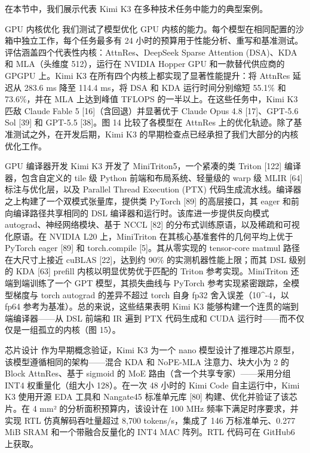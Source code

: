 \documentclass[
  10
]{article}
\begin{document}
在本节中，我们展示代表 Kimi K3 在多种技术任务中能力的典型案例。

GPU 内核优化 我们测试了模型优化 GPU 内核的能力。每个模型在相同配置的沙箱中独立工作，每个任务最多有 24 小时的预算用于性能分析、重写和基准测试。评估涵盖四个代表性内核：AttnRes、DeepSeek Sparse Attention (DSA)、KDA 和 MLA（头维度 512），运行在 NVIDIA Hopper GPU 和一款替代供应商的 GPGPU 上。Kimi K3 在所有四个内核上都实现了显著性能提升：将 AttnRes 延迟从 283.6 ms 降至 114.4 ms，将 DSA 和 KDA 运行时间分别缩短 55.1\% 和 73.6\%，并在 MLA 上达到峰值 TFLOPS 的一半以上。在这些任务中，Kimi K3 匹敌 Claude Fable 5 {[}16{]}（含回退）并显著优于 Claude Opus 4.8 {[}17{]}、GPT-5.6 Sol {[}39{]} 和 GPT-5.5 {[}38{]}。图 14 比较了各模型在 AttnRes 上的优化轨迹。除了基准测试之外，在开发后期，Kimi K3 的早期检查点已经承担了我们大部分的内核优化工作。

GPU 编译器开发 Kimi K3 开发了 MiniTriton5，一个紧凑的类 Triton {[}122{]} 编译器，包含自定义的 tile 级 Python 前端和布局系统、轻量级的 warp 级 MLIR {[}64{]} 标注与优化层，以及 Parallel Thread Execution (PTX) 代码生成流水线。编译器之上构建了一个双模式张量库，提供类 PyTorch {[}89{]} 的高层接口，其 eager 和前向编译路径共享相同的 DSL 编译器和运行时。该库进一步提供反向模式 autograd、神经网络模块、基于 NCCL {[}82{]} 的分布式训练原语，以及稀疏和可视化原语。在 NVIDIA L20 上，MiniTriton 在其核心基准套件的几何平均上优于 PyTorch eager {[}89{]} 和 torch.compile {[}5{]}。其从零实现的 tensor-core matmul 路径在大尺寸上接近 cuBLAS {[}22{]}，达到约 90\% 的实测机器性能上限；而其 DSL 级别的 KDA {[}63{]} prefill 内核以明显优势优于匹配的 Triton 参考实现。MiniTriton 还端到端训练了一个 GPT 模型，其损失曲线与 PyTorch 参考实现紧密跟踪，全模型梯度与 torch autograd 的差异不超过 torch 自身 fp32 舍入误差（10^{-4}，以 fp64 参考为基准）。总的来说，这些结果表明 Kimi K3 能够构建一个连贯的端到端编译器——从 DSL 前端和 IR 遍到 PTX 代码生成和 CUDA 运行时——而不仅仅是一组孤立的内核（图 15）。

芯片设计 作为早期概念验证，Kimi K3 为一个 nano 模型设计了推理芯片原型，该模型遵循相同的架构——混合 KDA 和 NoPE-MLA 注意力、块大小为 2 的 Block AttnRes、基于 sigmoid 的 MoE 路由（含一个共享专家）——采用分组 INT4 权重量化（组大小 128）。在一次 48 小时的 Kimi Code 自主运行中，Kimi K3 使用开源 EDA 工具和 Nangate45 标准单元库 {[}80{]} 构建、优化并验证了该芯片。在 4 mm² 的分析面积预算内，该设计在 100 MHz 频率下满足时序要求，并实现 RTL 仿真解码吞吐量超过 8,700 tokens/s，集成了 146 万标准单元、0.277 MiB SRAM 和一个带融合反量化的 INT4 MAC 阵列。RTL 代码可在 GitHub6 上获取。
\end{document}
